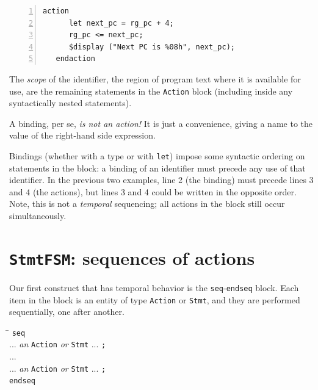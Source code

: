 {\small
\begin{Verbatim}[frame=single, numbers=left]
   action
      let next_pc = rg_pc + 4;
      rg_pc <= next_pc;
      $display ("Next PC is %08h", next_pc);
   endaction
\end{Verbatim}
}

The \emph{scope} of the identifier, {\ie} the region of program text
where it is available for use, are the remaining statements in the
{\tt Action} block (including inside any syntactically nested
statements).

A binding, per se, \emph{is not an action!}  It is just a convenience,
giving a name to the value of the right-hand side expression.

Bindings (whether with a type or with \verb|let|) impose some
syntactic ordering on statements in the block: a binding of an
identifier must precede any use of that identifier.  In the previous
two examples, line 2 (the binding) must precede lines 3 and 4 (the
actions), but lines 3 and 4 could be written in the opposite order.
Note, this is not a \emph{temporal} sequencing; all actions in the
block still occur simultaneously.


\section{{\tt StmtFSM}: sequences of actions}


Our first construct that has temporal behavior is the
\verb|seq|-\verb|endseq| block.  Each item in the block is an entity
of type \verb|Action| or \verb|Stmt|, and they are performed
sequentially, one after another.

\begin{tabbing}
\hmm \= \hm \kill
\hmm \> {\tt seq} \\
     \> \hm    ... \emph{an} {\tt Action} \emph{or} {\tt Stmt} ... {\tt ;} \\
     \> \hm    ... \\
     \> \hm    ... \emph{an} {\tt Action} \emph{or} {\tt Stmt} ... {\tt ;} \\
     \> {\tt endseq}
\end{tabbing}


